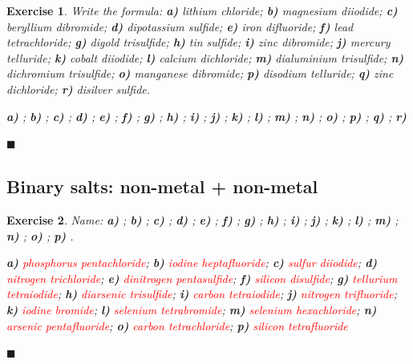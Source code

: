 \documentclass[12pt]{article}
\theoremstyle{mygreennumbox}
\newtheorem{ejercicioT}{Exercise}[section]
\newenvironment{exercise}{\begin{eBoxmygreen}\begin{ejercicioT}}{\hfill{\color{mygreen}\tiny\ensuremath{\blacksquare}}\end{ejercicioT}\end{eBoxmygreen}}
\begin{document}
\begin{exercise}
    Write the formula: \textbf{a)} lithium chloride; \textbf{b)} magnesium diiodide; \textbf{c)} beryllium dibromide; \textbf{d)} dipotassium sulfide; \textbf{e)} iron difluoride; \textbf{f)} lead tetrachloride; \textbf{g)} digold trisulfide; \textbf{h)} tin sulfide; \textbf{i)} zinc dibromide; \textbf{j)} mercury telluride; \textbf{k)} cobalt diiodide; \textbf{l)} calcium dichloride; \textbf{m)} dialuminium trisulfide; \textbf{n)} dichromium trisulfide; \textbf{o)} manganese dibromide; \textbf{p)} disodium telluride; \textbf{q)} zinc dichloride; \textbf{r)} disilver sulfide.
    \begin{solu}
        \textbf{a)} \textcolor{red}{}; \textbf{b)} \textcolor{red}{}; \textbf{c)} \textcolor{red}{}; \textbf{d)} \textcolor{red}{}; \textbf{e)} \textcolor{red}{}; \textbf{f)} \textcolor{red}{}; \textbf{g)} \textcolor{red}{}; \textbf{h)} \textcolor{red}{}; \textbf{i)} \textcolor{red}{}; \textbf{j)} \textcolor{red}{}; \textbf{k)} \textcolor{red}{}; \textbf{l)} \textcolor{red}{}; \textbf{m)} \textcolor{red}{}; \textbf{n)} \textcolor{red}{}; \textbf{o)} \textcolor{red}{}; \textbf{p)} \textcolor{red}{}; \textbf{q)} \textcolor{red}{}; \textbf{r)} \textcolor{red}{}
    \end{solu}
\end{exercise}

\subsection{Binary salts: non-metal + non-metal}

\begin{exercise}
    Name: \textbf{a)} ; \textbf{b)} ; \textbf{c)} ; \textbf{d)} ; \textbf{e)} ; \textbf{f)} ; \textbf{g)} ; \textbf{h)} ; \textbf{i)} ; \textbf{j)} ; \textbf{k)} ; \textbf{l)} ; \textbf{m)} ; \textbf{n)} ; \textbf{o)} ; \textbf{p)} .
    \begin{solu}
        \textbf{a)} \textcolor{red}{phosphorus pentachloride}; \textbf{b)} \textcolor{red}{iodine heptafluoride}; \textbf{c)} \textcolor{red}{sulfur diiodide}; \textbf{d)} \textcolor{red}{nitrogen trichloride}; \textbf{e)} \textcolor{red}{dinitrogen pentasulfide}; \textbf{f)} \textcolor{red}{silicon disulfide}; \textbf{g)} \textcolor{red}{tellurium tetraiodide}; \textbf{h)} \textcolor{red}{diarsenic trisulfide}; \textbf{i)} \textcolor{red}{carbon tetraiodide}; \textbf{j)} \textcolor{red}{nitrogen trifluoride}; \textbf{k)} \textcolor{red}{iodine bromide}; \textbf{l)} \textcolor{red}{selenium tetrabromide}; \textbf{m)} \textcolor{red}{selenium hexachloride}; \textbf{n)} \textcolor{red}{arsenic pentafluoride}; \textbf{o)} \textcolor{red}{carbon tetrachloride}; \textbf{p)} \textcolor{red}{silicon tetrafluoride}
    \end{solu}
\end{exercise}
\end{document}
